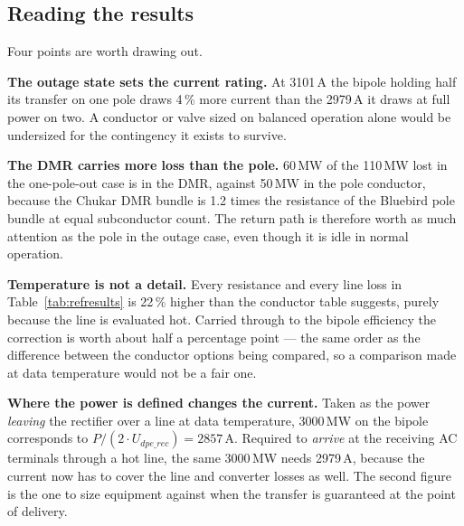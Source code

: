 \subsection{Reading the results}
Four points are worth drawing out.

\textbf{The outage state sets the current rating.} At 3101\,A the bipole
holding half its transfer on one pole draws 4\,\% more current than the 2979\,A
it draws at full power on two. A conductor or valve sized on balanced operation
alone would be undersized for the contingency it exists to survive.

\textbf{The DMR carries more loss than the pole.} 60\,MW of the 110\,MW lost
in the one-pole-out case is in the DMR, against 50\,MW in the pole conductor,
because the Chukar DMR bundle is 1.2 times the resistance of the Bluebird pole
bundle at equal subconductor count. The return path is therefore worth as much
attention as the pole in the outage case, even though it is idle in normal
operation.

\textbf{Temperature is not a detail.} Every resistance and every line loss in
Table~\ref{tab:refresults} is 22\,\% higher than the conductor table suggests,
purely because the line is evaluated hot. Carried through to the bipole
efficiency the correction is worth about half a percentage point --- the same
order as the difference between the conductor options being compared, so a
comparison made at data temperature would not be a fair one.

\textbf{Where the power is defined changes the current.} Taken as the power
\emph{leaving} the rectifier over a line at data temperature, 3000\,MW on the
bipole corresponds to $P/(2\cdot U_{dpe\_rec}) = 2857\,\mathrm{A}$. Required to
\emph{arrive} at the receiving AC terminals through a hot line, the same
3000\,MW needs 2979\,A, because the current now has to cover the line and
converter losses as well. The second figure is the one to size equipment
against when the transfer is guaranteed at the point of delivery.
